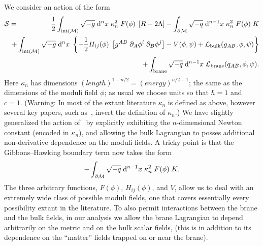 \documentclass[a4paper,10pt]{article}
\begin{document}
We consider an action of the form
%
\begin{eqnarray}
\S=&&\hspace{-6mm}
{1 \over 2}\int_{{\rm int}(\M)} \sqrt{-g} \;\d^n x \; \kappa_n^{2} \;
F(\phi) \; \left[ R -2\Lambda \right] 
-\int_{\partial\M} \sqrt{-q} \;\d^{n-1}x \;  \kappa_n^{2} \; F(\phi)\;K
\nonumber\\  
&&\hspace{-6mm}
+\int_{{\rm int}(\M)} \sqrt{-g} \;\d^n x \;
\left\{ -{1 \over 2} 
H_{ij}(\phi) \; 
\left[ g^{AB} \; \partial_{A}\phi^i \; \partial_{B}\phi^j \right] 
-V(\phi,\psi) 
+\L_\bulk(g_{AB},\phi,\psi)
\right\}
\nonumber \\  
&&\hspace{-6mm}
+\int_{\rm brane} \sqrt{-q} \;\d^{n-1}x\;\L_\brane(q_{AB},\phi,\psi).
\label{E:action}
\end{eqnarray}
%
Here $\kappa_n$ has dimensions $(length)^{1-n/2}=(energy)^{n/2-1}$;
the same as the dimensions of the moduli field $\phi$; as usual we
choose units so that $\hbar=1$ and $c=1$.  (Warning: In most of the
extant literature $\kappa_n$ is defined as above, however several key
papers, such as~\cite{Shiromizu,Wands}, invert the definition of
$\kappa_n$.) We have slightly generalized the action
of~\cite{generalized-junction} by explicitly exhibiting the
$n$-dimensional Newton constant (encoded in $\kappa_n$), and allowing the bulk
Lagrangian to posses additional non-derivative dependence on the
moduli fields.  A tricky point is that the Gibbons--Hawking boundary
term now takes the form~\cite{generalized-junction}
%
\begin{equation}
-\int_{\partial{\mathcal M}} \sqrt{-q} \;{\mathrm d}^{n-1}x \;  \kappa_n^{2} \; F(\phi)\;K.
\end{equation}
%
The three arbitrary functions, $F(\phi)$, $H_{ij}(\phi)$, and $V$,
allow us to deal with an extremely wide class of possible moduli
fields, one that covers essentially every possibility extant in the
literature.  To also permit interactions between the brane and the
bulk fields, in our analysis we allow the brane Lagrangian to depend
arbitrarily on the metric and on the bulk scalar fields, (this is in
addition to its dependence on the ``matter'' fields trapped on or near
the brane).
\end{document}
